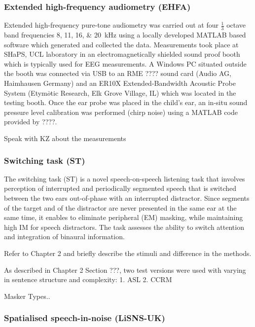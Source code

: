 \documentclass[a4paper, twoside]{templates/ociamthesis}
\begin{document}
\hypertarget{extended-high-frequency-audiometry-ehfa}{%
\subsubsection{Extended high-frequency audiometry (EHFA)}\label{extended-high-frequency-audiometry-ehfa}}

Extended high-frequency pure-tone audiometry was carried out at four \(\frac{1}{3}\) octave band frequencies 8, 11, 16, \& 20~kHz using a locally developed MATLAB based software which generated and collected the data. Measurements took place at SHaPS, UCL laboratory in an electromagnetically shielded sound proof booth which is typically used for EEG measurements. A Windows PC situated outside the booth was connected via USB to an RME ???? sound card (Audio AG, Haimhausen Germany) and an ER10X Extended-Bandwidth Acoustic Probe System (Etym\(\bar{o}\)tic Research, Elk Grove Village, IL) which was located in the testing booth. Once the ear probe was placed in the child's ear, an in-situ sound pressure level calibration was performed (chirp noise) using a MATLAB code provided by ????.

Speak with KZ about the measurements

\hypertarget{switching-task-st}{%
\subsubsection{Switching task (ST)}\label{switching-task-st}}

The switching task (ST) is a novel speech-on-speech listening task that involves perception of interrupted and periodically segmented speech that is switched between the two ears out-of-phase with an interrupted distractor. Since segments of the target and of the distractor are never presented in the same ear at the same time, it enables to eliminate peripheral (EM) masking, while maintaining high IM for speech distractors. The task assesses the ability to switch attention and integration of binaural information.

Refer to Chapter 2 and briefly describe the stimuli and difference in the methods.

As described in Chapter 2 Section ???, two test versions were used with varying in sentence structure and complexity: 1. ASL 2. CCRM

Masker Types..

\hypertarget{spatialised-speech-in-noise-lisns-uk}{%
\subsubsection{Spatialised speech-in-noise (LiSNS-UK)}\label{spatialised-speech-in-noise-lisns-uk}}
\end{document}
